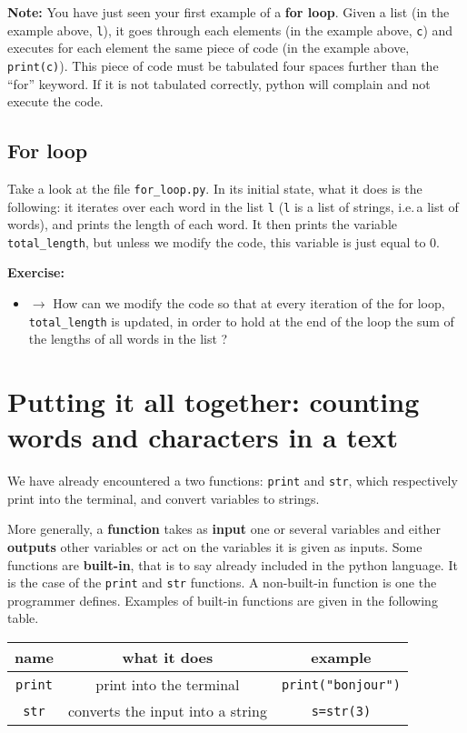 \documentclass{article}
\newcommand{\note}[1]{
\begin{mdframed}[backgroundcolor=green!30!white]
\textbf{Note:} #1
\end{mdframed}
}
\newcommand{\exercise}[1]{
\begin{mdframed}[backgroundcolor=black!20!white]
\textbf{Exercise:} #1
\end{mdframed}
}
\begin{document}
\note{You have just seen your first example of a \textbf{for loop}.
Given a list (in the example above, {\tt l}), it goes through each elements
(in the example above, {\tt c}) and executes for each element the
same piece of code (in the example above, {\tt print(c)}). 
This piece of code must be tabulated four spaces further than the ``for'' keyword.
If it is not tabulated correctly, python will complain and not
execute the code.
}

\subsection{For loop}

Take a look at the file {\tt for\_loop.py}.
In its initial state, what it does is the following:
it iterates over each word in the list {\tt l} ({\tt l} is 
a list of strings, i.e.\,a list of words), and
prints the length of each word.
It then prints the variable {\tt total\_length}, but unless we modify
the code, this variable is just equal to 0.

\exercise{
\begin{itemize}
    \item $\rightarrow$ How can we modify the code so that
        at every iteration of the for loop, {\tt total\_length}
        is updated, in order to hold at the end of the loop the sum
        of the lengths of all words in the list ?
\end{itemize}
}


\section{Putting it all together: counting words and characters in a text}

We have already encountered a two functions: {\tt print} and {\tt str},
which respectively print into the terminal, and convert variables to strings.

More generally, a \textbf{function} takes as \textbf{input} one or
several variables and either \textbf{outputs} other variables or
act on the variables it is given as inputs. Some functions are
\textbf{built-in}, that is to say already included in the python language.
It is the case of the {\tt print} and {\tt str} functions. A non-built-in
function is one the programmer defines. 
Examples of built-in functions are given in the following table.
\begin{center}
    \begin{tabular}{|c|c|c|}
    \hline
    name & what it does & example \\
    \hline
        {\tt print} & print into the terminal & {\tt print("bonjour")}\\
    \hline
        {\tt str} & converts the input into a string & {\tt s=str(3)}\\
    \hline
    \end{tabular}
\end{center}
\end{document}
